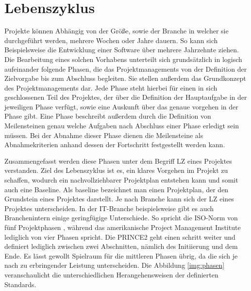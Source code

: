 \section{Lebenszyklus}
	
	Projekte können Abhängig von der Größe, sowie der Branche in welcher sie durchgeführt werden, mehrere Wochen oder Jahre dauern. So kann sich Beispielsweise die Entwicklung einer Software über mehrere Jahrzehnte ziehen. Die Bearbeitung eines solchen Vorhabens unterteilt sich grundsätzlich in logisch aufeinander folgende Phasen, die das Projektmanagements von der Definition der Zielvorgabe bis zum Abschluss begleiten. Sie stellen außerdem das Grundkonzept des Projektmanagements dar.\autocite[107-110]{madauss2019} Jede Phase steht hierbei für einen in sich geschlossenen Teil des Projektes, der über die Definition der Hauptaufgabe in der jeweiligen Phase verfügt, sowie eine Auskunft über das genaue vorgehen in der Phase gibt. Eine Phase beschreibt außerdem durch die Definition von Meilensteinen genau welche Aufgaben nach Abschluss einer Phase erledigt sein müssen. Bei der Abnahme dieser Phase dienen die Meilensteine als Abnahmekriterien anhand dessen der Fortschritt festgestellt werden kann.\autocite[16]{Meyer2020}
	
	Zusammengefasst werden diese Phasen unter dem Begriff \ac{LZ} eines Projektes verstanden. Ziel des Lebenszyklus ist es, ein klares Vorgehen im Projekt zu schaffen, wodurch ein nachvollziehbarer Projektplan entstehen kann und somit auch eine Baseline. Als baseline bezeichnet man einen Projektplan, der den Grundstein eines Projektes darstellt. Je nach Branche kann sich der \acs{LZ} eines Projektes unterscheiden.\autocite[14]{Meyer2020} In der IT-Branche beispielsweise gibt es auch Branchenintern einige geringfügige Unterschiede. So spricht die ISO-Norm von fünf Projektphasen \autocite[11]{DIN69901-2}, während das amerikanische Project Management Institute lediglich von vier Phasen spricht. Die PRINCE2 geht einen schritt weiter und definiert lediglich zwischen zwei Abschnitten, nämlich des Initiierung und dem Ende. Es lässt gewollt Spielraum für die mittleren Phasen übrig, da die sich je nach zu erbringender Leistung unterscheiden\autocite[15]{Meyer2020}. Die Abbildung \ref{img:phasen} veranschaulicht die unterschiedlichen Herangehensweisen der definierten Standards. 
	
